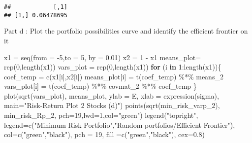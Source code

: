 \documentclass[
]{article}
\newenvironment{Shaded}{\begin{snugshade}}{\end{snugshade}}
\newcommand{\AttributeTok}[1]{\textcolor[rgb]{0.77,0.63,0.00}{#1}}
\newcommand{\ControlFlowTok}[1]{\textcolor[rgb]{0.13,0.29,0.53}{\textbf{#1}}}
\newcommand{\DecValTok}[1]{\textcolor[rgb]{0.00,0.00,0.81}{#1}}
\newcommand{\FloatTok}[1]{\textcolor[rgb]{0.00,0.00,0.81}{#1}}
\newcommand{\FunctionTok}[1]{\textcolor[rgb]{0.00,0.00,0.00}{#1}}
\newcommand{\NormalTok}[1]{#1}
\newcommand{\OtherTok}[1]{\textcolor[rgb]{0.56,0.35,0.01}{#1}}
\newcommand{\SpecialCharTok}[1]{\textcolor[rgb]{0.00,0.00,0.00}{#1}}
\newcommand{\StringTok}[1]{\textcolor[rgb]{0.31,0.60,0.02}{#1}}
\begin{document}
\begin{verbatim}
##            [,1]
## [1,] 0.06478695
\end{verbatim}

Part d : Plot the portfolio possibilities curve and identify the
efficient frontier on it

\begin{Shaded}
\begin{Highlighting}[]
\NormalTok{x1 }\OtherTok{=} \FunctionTok{seq}\NormalTok{(}\AttributeTok{from =} \SpecialCharTok{{-}}\DecValTok{5}\NormalTok{,}\AttributeTok{to =} \DecValTok{5}\NormalTok{, }\AttributeTok{by =} \FloatTok{0.01}\NormalTok{) }
\NormalTok{x2 }\OtherTok{=} \DecValTok{1} \SpecialCharTok{{-}}\NormalTok{ x1}
\NormalTok{means\_plot}\OtherTok{=} \FunctionTok{rep}\NormalTok{(}\DecValTok{0}\NormalTok{,}\FunctionTok{length}\NormalTok{(x1))}
\NormalTok{vars\_plot }\OtherTok{=} \FunctionTok{rep}\NormalTok{(}\DecValTok{0}\NormalTok{,}\FunctionTok{length}\NormalTok{(x1))}
\ControlFlowTok{for}\NormalTok{ (i }\ControlFlowTok{in} \DecValTok{1}\SpecialCharTok{:}\FunctionTok{length}\NormalTok{(x1))\{}
\NormalTok{  coef\_temp }\OtherTok{=} \FunctionTok{c}\NormalTok{(x1[i],x2[i])}
\NormalTok{  means\_plot[i] }\OtherTok{=} \FunctionTok{t}\NormalTok{(coef\_temp) }\SpecialCharTok{\%*\%}\NormalTok{ means\_2}
\NormalTok{  vars\_plot[i] }\OtherTok{=} \FunctionTok{t}\NormalTok{(coef\_temp) }\SpecialCharTok{\%*\%}\NormalTok{ covmat\_2 }\SpecialCharTok{\%*\%}\NormalTok{ coef\_temp}
\NormalTok{\}}
\FunctionTok{plot}\NormalTok{(}\FunctionTok{sqrt}\NormalTok{(vars\_plot), means\_plot, }\AttributeTok{ylab =} \StringTok{\textquotesingle{}E\textquotesingle{}}\NormalTok{, }\AttributeTok{xlab =} \FunctionTok{expression}\NormalTok{(sigma), }\AttributeTok{main=}\StringTok{"Risk{-}Return Plot 2 Stocks (d)"}\NormalTok{) }
\FunctionTok{points}\NormalTok{(}\FunctionTok{sqrt}\NormalTok{(min\_risk\_varp\_2), min\_risk\_Rp\_2, }\AttributeTok{pch=}\DecValTok{19}\NormalTok{,}\AttributeTok{lwd=}\DecValTok{1}\NormalTok{,}\AttributeTok{col=}\StringTok{"green"}\NormalTok{)}
\FunctionTok{legend}\NormalTok{(}\StringTok{"topright"}\NormalTok{, }
       \AttributeTok{legend=}\FunctionTok{c}\NormalTok{(}\StringTok{"Minimum Risk Portfolio"}\NormalTok{,}\StringTok{"Random portfolios/Efficient Frontier"}\NormalTok{),}
       \AttributeTok{col=}\FunctionTok{c}\NormalTok{(}\StringTok{"green"}\NormalTok{,}\StringTok{"black"}\NormalTok{),}
       \AttributeTok{pch =} \DecValTok{19}\NormalTok{,}
       \AttributeTok{fill =}\FunctionTok{c}\NormalTok{(}\StringTok{"green"}\NormalTok{,}\StringTok{"black"}\NormalTok{),}
       \AttributeTok{cex=}\FloatTok{0.8}\NormalTok{)}
\end{Highlighting}
\end{Shaded}
\end{document}

